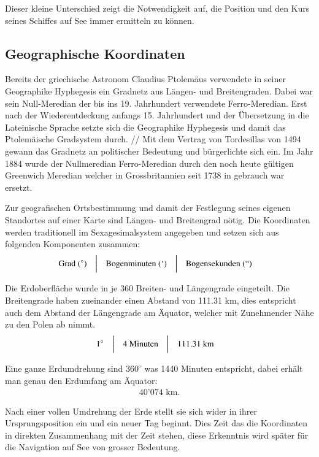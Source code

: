 \begin{refsection}
Dieser kleine Unterschied zeigt die Notwendigkeit auf, die Position und den Kurs seines Schiffes auf See immer ermitteln zu können.


\subsection{Geographische Koordinaten}
Bereits der griechische Astronom Claudius Ptolemäus verwendete in seiner Geographike Hyphegesis ein Gradnetz aus Längen- und Breitengraden. Dabei war sein Null-Meredian der bis ins 19. Jahrhundert verwendete Ferro-Meredian. Erst nach der Wiederentdeckung anfangs 15. Jahrhundert und der Übersetzung in die Lateinische Sprache setzte sich die Geographike Hyphegesis und damit das Ptolemäische Gradsystem durch. //
Mit dem Vertrag von Tordesillas von 1494 gewann das Gradnetz an politischer Bedeutung und bürgerlichte sich ein.
Im Jahr 1884 wurde der Nullmeredian Ferro-Meredian durch den noch heute gültigen Greenwich Meredian welcher in Grossbritannien seit 1738 in gebrauch war ersetzt.

Zur geografischen Ortsbestimmung und damit der Festlegung seines eigenen Standortes auf einer Karte sind Längen- und Breitengrad nötig. 
Die Koordinaten werden traditionell im Sexagesimalsystem angegeben und setzen sich aus folgenden Komponenten zusammen:
\[
\begin{aligned}
&\text{Grad } (^{\circ})
&
&\text{\bigg \vert}
&
&\text{Bogenminuten } (`)
&
&\text{\bigg \vert}
&
&\text{Bogensekunden } (``)
\end{aligned}
\]

Die Erdoberfläche wurde in je 360 Breiten- und Längengrade eingeteilt. Die Breitengrade haben zueinander einen Abstand von 111.31 km, dies entspricht auch dem Abstand der Längengrade am Äquator, welcher mit Zunehmender Nähe zu den Polen ab nimmt.
\[
\begin{aligned}
&1^{\circ}
&
&\text{\bigg \vert}
&
&4 \text{ Minuten}
&
&\text{\bigg \vert}
&
&111.31\text{ km}
\end{aligned}
\]

Eine ganze Erdumdrehung sind $360 ^{\circ}$ was 1440 Minuten entspricht, dabei erhält man genau den Erdumfang am Äquator:
\begin{align*} 40’074 \text{ km.}\end{align*}

Nach einer vollen Umdrehung der Erde stellt sie sich wider in ihrer Ursprungsposition ein und ein neuer Tag beginnt. Dies Zeit das die Koordinaten in direkten Zusammenhang mit der Zeit stehen, diese Erkenntnis wird später für die Navigation auf See von grosser Bedeutung.



\end{refsection}
